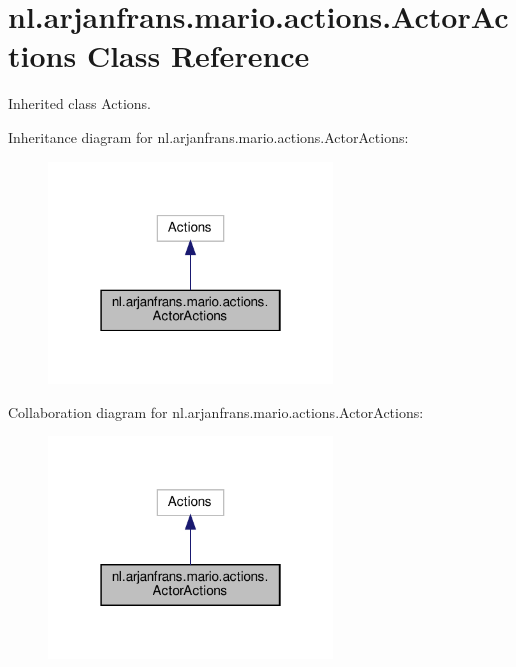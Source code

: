 \hypertarget{classnl_1_1arjanfrans_1_1mario_1_1actions_1_1ActorActions}{}\section{nl.\+arjanfrans.\+mario.\+actions.\+Actor\+Actions Class Reference}
\label{classnl_1_1arjanfrans_1_1mario_1_1actions_1_1ActorActions}


Inherited class Actions.  




Inheritance diagram for nl.\+arjanfrans.\+mario.\+actions.\+Actor\+Actions\+:\nopagebreak
\begin{figure}[H]
\begin{center}
\leavevmode
\includegraphics[width=214pt]{classnl_1_1arjanfrans_1_1mario_1_1actions_1_1ActorActions__inherit__graph}
\end{center}
\end{figure}


Collaboration diagram for nl.\+arjanfrans.\+mario.\+actions.\+Actor\+Actions\+:\nopagebreak
\begin{figure}[H]
\begin{center}
\leavevmode
\includegraphics[width=214pt]{classnl_1_1arjanfrans_1_1mario_1_1actions_1_1ActorActions__coll__graph}
\end{center}
\end{figure}
